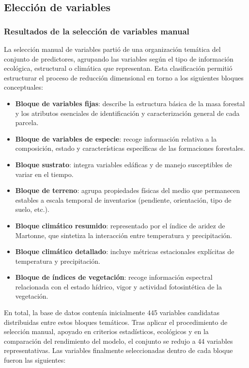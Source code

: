 \subsection{Elección de variables}

\subsubsection{Resultados de la selección de variables manual}

La selección manual de variables partió de una organización temática del conjunto de
predictores, agrupando las variables según el tipo de información ecológica,
estructural o climática que representan. Esta clasificación permitió estructurar
el proceso de reducción dimensional en torno a los siguientes bloques conceptuales:

\begin{itemize}
    \item \textbf{Bloque de variables fijas}: describe la estructura básica de la
          masa forestal y los atributos esenciales de identificación y caracterización
          general de cada parcela.
    \item \textbf{Bloque de variables de especie}: recoge información relativa a la composición, estado y características específicas de las formaciones forestales.
    \item \textbf{Bloque sustrato}: integra variables edáficas y de manejo susceptibles de variar en el tiempo.
    \item \textbf{Bloque de terreno}: agrupa propiedades físicas del medio que permanecen estables a escala temporal de inventarios (pendiente, orientación, tipo de suelo, etc.).
    \item \textbf{Bloque climático resumido}: representado por el índice de aridez de Martonne, que sintetiza la interacción entre temperatura y precipitación.
    \item \textbf{Bloque climático detallado}: incluye métricas estacionales explícitas de temperatura y precipitación.
    \item \textbf{Bloque de índices de vegetación}: recoge información espectral relacionada con el estado hídrico, vigor y actividad fotosintética de la vegetación.
\end{itemize}

En total, la base de datos contenía inicialmente 445 variables candidatas distribuidas entre estos bloques temáticos. Tras aplicar el procedimiento de selección manual, apoyado en criterios estadísticos, ecológicos y en la comparación del rendimiento del modelo, el conjunto se redujo a 44 variables representativas. Las variables finalmente seleccionadas dentro de cada bloque fueron las siguientes:

